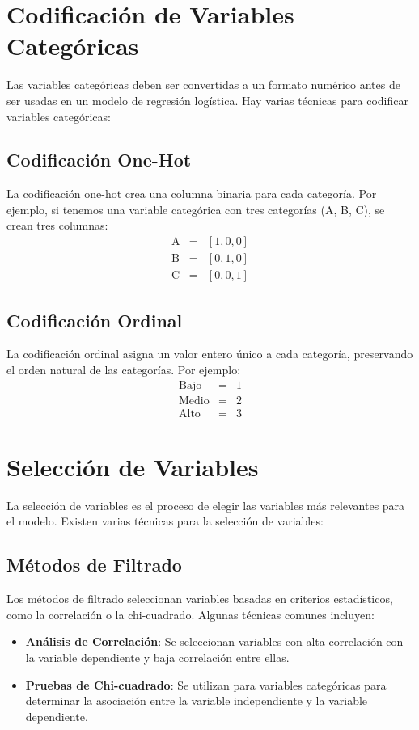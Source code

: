 \documentclass[a4paper]{report} %
\begin{document}
\section{Codificaci\'on de Variables Categ\'oricas}

Las variables categ\'oricas deben ser convertidas a un formato num\'erico antes de ser usadas en un modelo de regresi\'on log\'istica. Hay varias t\'ecnicas para codificar variables categ\'oricas:

\subsection{Codificaci\'on One-Hot}

La codificaci\'on one-hot crea una columna binaria para cada categor\'ia. Por ejemplo, si tenemos una variable categ\'orica con tres categor\'ias (A, B, C), se crean tres columnas:
\begin{eqnarray*}
\text{A} &=& [1, 0, 0] \\
\text{B} &=& [0, 1, 0] \\
\text{C} &=& [0, 0, 1]
\end{eqnarray*}

\subsection{Codificaci\'on Ordinal}

La codificaci\'on ordinal asigna un valor entero \'unico a cada categor\'ia, preservando el orden natural de las categor\'ias. Por ejemplo:
\begin{eqnarray*}
\text{Bajo} &=& 1 \\
\text{Medio} &=& 2 \\
\text{Alto} &=& 3
\end{eqnarray*}

\section{Selecci\'on de Variables}

La selecci\'on de variables es el proceso de elegir las variables m\'as relevantes para el modelo. Existen varias t\'ecnicas para la selecci\'on de variables:

\subsection{M\'etodos de Filtrado}

Los m\'etodos de filtrado seleccionan variables basadas en criterios estad\'isticos, como la correlaci\'on o la chi-cuadrado. Algunas t\'ecnicas comunes incluyen:
\begin{itemize}
    \item \textbf{An\'alisis de Correlaci\'on}: Se seleccionan variables con alta correlaci\'on con la variable dependiente y baja correlaci\'on entre ellas.
    \item \textbf{Pruebas de Chi-cuadrado}: Se utilizan para variables categ\'oricas para determinar la asociaci\'on entre la variable independiente y la variable dependiente.
\end{itemize}
\end{document}
